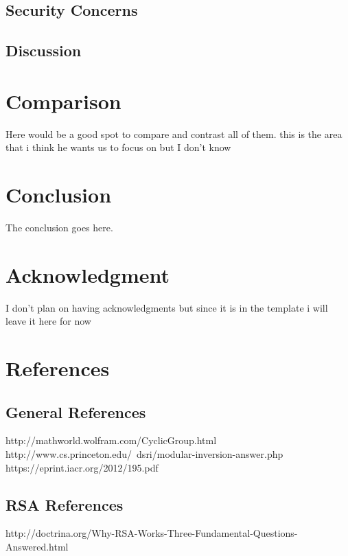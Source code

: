 \documentclass[conference]{IEEEtran}
\begin{document}
\subsection{Security Concerns}
\subsection{Discussion}



\section{Comparison}
Here would be a good spot to compare and contrast all of them. this is the area that i think he wants us to focus on but I don't know


\section{Conclusion}
The conclusion goes here.


\section*{Acknowledgment}

I don't plan on having acknowledgments but since it is in the template i will leave it here for now





\section{References}
\subsection{General References}
http://mathworld.wolfram.com/CyclicGroup.html \newline
http://www.cs.princeton.edu/~dsri/modular-inversion-answer.php \newline
https://eprint.iacr.org/2012/195.pdf \newline

\subsection{RSA References}
http://doctrina.org/Why-RSA-Works-Three-Fundamental-Questions-Answered.html \newline
\end{document}
